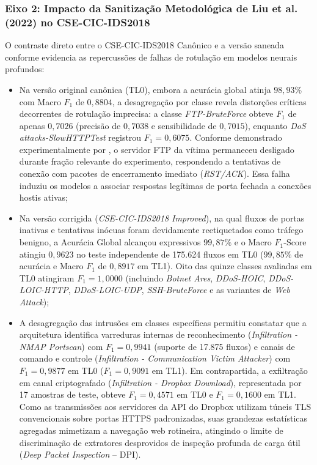 \subsubsection{Eixo 2: Impacto da Sanitização Metodológica de Liu et al. (2022) no CSE-CIC-IDS2018}

O contraste direto entre o CSE-CIC-IDS2018 Canônico e a versão saneada conforme
 evidencia as repercussões de falhas de rotulação em modelos neurais
profundos:
\begin{itemize}
    \item Na versão original canônica (TL0), embora a acurácia global atinja $98{,}93\%$ com Macro
    $F_1$ de $0{,}8804$, a desagregação por classe revela distorções críticas decorrentes de rotulação
    imprecisa: a classe \emph{FTP-BruteForce} obteve $F_1$ de apenas $0{,}7026$ (precisão de $0{,}7038$
    e sensibilidade de $0{,}7015$), enquanto \emph{DoS attacks-SlowHTTPTest} registrou $F_1 = 0{,}6075$.
    Conforme demonstrado experimentalmente por , o servidor FTP da vítima
    permaneceu desligado durante fração relevante do experimento, respondendo a tentativas de conexão
    com pacotes de encerramento imediato (\emph{RST/ACK}). Essa falha induziu os modelos a associar
    respostas legítimas de porta fechada a conexões hostis ativas;
    
    \item Na versão corrigida (\emph{CSE-CIC-IDS2018 Improved}), na qual fluxos de portas inativas
    e tentativas inócuas foram devidamente reetiquetados como tráfego benigno, a Acurácia Global
    alcançou expressivos $99{,}87\%$ e o Macro $F_1$-Score atingiu $0{,}9623$ no teste independente de
    175.624 fluxos em TL0 ($99{,}85\%$ de acurácia e Macro $F_1$ de $0{,}8917$ em TL1). Oito das quinze
    classes avaliadas em TL0 atingiram $F_1 = 1{,}0000$ (incluindo \emph{Botnet Ares}, \emph{DDoS-HOIC},
    \emph{DDoS-LOIC-HTTP}, \emph{DDoS-LOIC-UDP}, \emph{SSH-BruteForce} e as variantes de \emph{Web Attack});
    
    \item A desagregação das intrusões em classes específicas permitiu constatar que a arquitetura
    identifica varreduras internas de reconhecimento (\emph{Infiltration - NMAP Portscan}) com
    $F_1 = 0{,}9941$ (suporte de 17.875 fluxos) e canais de comando e controle
    (\emph{Infiltration - Communication Victim Attacker}) com $F_1 = 0{,}9877$ em TL0 ($F_1 = 0{,}9091$
    em TL1). Em contrapartida, a exfiltração em canal criptografado
    (\emph{Infiltration - Dropbox Download}), representada por 17 amostras de teste, obteve
    $F_1 = 0{,}4571$ em TL0 e $F_1 = 0{,}1600$ em TL1. Como as transmissões aos servidores da API do
    Dropbox utilizam túneis TLS convencionais sobre portas HTTPS padronizadas, suas grandezas
    estatísticas agregadas mimetizam a navegação web rotineira, atingindo o limite de discriminação
    de extratores desprovidos de inspeção profunda de carga útil (\emph{Deep Packet Inspection} -- DPI).
\end{itemize}

